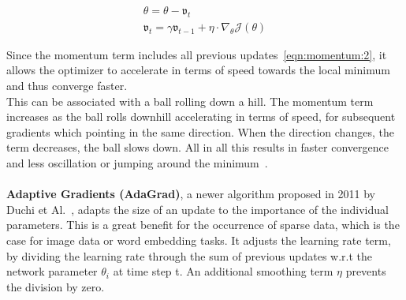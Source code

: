 \begin{align}
    \theta = \theta - \mathfrak{v}_t \label{eqn:momentum:1}\\
    \mathfrak{v}_t = \gamma\mathfrak{v}_{t-1} + \eta\cdot\nabla_\theta\mathcal{J}(\theta) \label{eqn:momentum:2}
\end{align}

Since the momentum term includes all previous updates~\ref{eqn:momentum:2}, it allows the optimizer to accelerate in terms of speed towards
the local minimum and thus converge faster.\\
This can be associated with a ball rolling down a hill.
The momentum term increases as the ball rolls downhill accelerating in terms of speed, for subsequent gradients
which pointing in the same direction.
When the direction changes, the term decreases, the ball slows down.
All in all this results in faster convergence and less oscillation or jumping around the minimum~\cite{optimizersoverview}.
\\\mbox{}\\
\textbf{Adaptive Gradients (AdaGrad)}, a newer algorithm proposed in 2011 by Duchi et Al.~\cite{adagrad},
adapts the size of an update to the importance of the individual parameters.
This is a great benefit for the occurrence of sparse data, which is the case for image data or word embedding tasks.
It adjusts the learning rate term, by dividing the learning rate through the sum
of previous updates w.r.t the network parameter $\theta_i$ at time step t.
An additional smoothing term $\eta$ prevents the division by zero.

